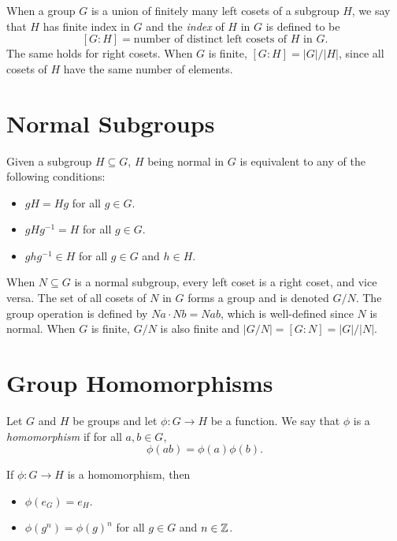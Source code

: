 \begin{definition}
	When a group $G$ is a union of finitely many left cosets of a subgroup $H$, we
	say that $H$ has finite index in $G$ and the \emph{index} of $H$ in $G$ is
	defined to be
	\[
		[G : H] = \text{number of distinct left cosets of $H$ in $G$}.
	\]
	The same holds for right cosets. When $G$ is finite, $[G : H] = |G|/|H|$,
	since all cosets of $H$ have the same number of elements.
\end{definition}

\section*{Normal Subgroups}

\begin{theorem}
	Given a subgroup $H \subseteq G$, $H$ being normal in $G$ is equivalent to
	any of the following conditions:
	\begin{itemize}
		\item $gH = Hg$ for all $g \in G$.
		\item $gHg^{-1} = H$ for all $g \in G$.
		\item $ghg^{-1} \in H$ for all $g \in G$ and $h \in H$.
	\end{itemize}
\end{theorem}

\begin{theorem}
	When $N \subseteq G$ is a normal subgroup, every left coset is a right coset,
	and vice versa.  The set of all cosets of $N$ in $G$ forms a group and is
	denoted $G/N$. The group operation is defined by $Na \cdot Nb = Nab$, which is
	well-defined since $N$ is normal. When $G$ is finite, $G/N$ is also finite and
	$|G/N| = [G : N] = |G|/|N|$.
\end{theorem}

\section*{Group Homomorphisms}

\begin{definition}
	Let $G$ and $H$ be groups and let $\phi : G \rightarrow H$ be a function. We
	say that $\phi$ is a \emph{homomorphism} if for all $a, b \in G$,
	\[
		\phi(ab) = \phi(a) \phi(b).
	\]
\end{definition}

\begin{theorem}
	If $\phi : G \rightarrow H$ is a homomorphism, then
	\begin{itemize}
		\item $\phi(e_G) = e_H$.
		\item $\phi(g^n) = {\phi(g)}^n$ for all $g \in G$ and $n \in {\mathbb{Z}}$.
	\end{itemize}
\end{theorem}

